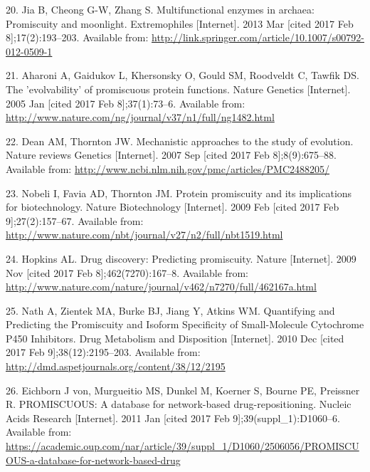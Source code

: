 \documentclass[12pt,twoside]{reedthesis}
\begin{document}
  \hypertarget{ref-jia_multifunctional_2013}{}
  20. Jia B, Cheong G-W, Zhang S. Multifunctional enzymes in archaea:
  Promiscuity and moonlight. Extremophiles {[}Internet{]}. 2013 Mar
  {[}cited 2017 Feb 8{]};17(2):193--203. Available from:
  \url{http://link.springer.com/article/10.1007/s00792-012-0509-1}
  
  \hypertarget{ref-aharoni_evolvability_2005}{}
  21. Aharoni A, Gaidukov L, Khersonsky O, Gould SM, Roodveldt C, Tawfik
  DS. The 'evolvability' of promiscuous protein functions. Nature Genetics
  {[}Internet{]}. 2005 Jan {[}cited 2017 Feb 8{]};37(1):73--6. Available
  from: \url{http://www.nature.com/ng/journal/v37/n1/full/ng1482.html}
  
  \hypertarget{ref-dean_mechanistic_2007}{}
  22. Dean AM, Thornton JW. Mechanistic approaches to the study of
  evolution. Nature reviews Genetics {[}Internet{]}. 2007 Sep {[}cited
  2017 Feb 8{]};8(9):675--88. Available from:
  \url{http://www.ncbi.nlm.nih.gov/pmc/articles/PMC2488205/}
  
  \hypertarget{ref-nobeli_protein_2009}{}
  23. Nobeli I, Favia AD, Thornton JM. Protein promiscuity and its
  implications for biotechnology. Nature Biotechnology {[}Internet{]}.
  2009 Feb {[}cited 2017 Feb 9{]};27(2):157--67. Available from:
  \url{http://www.nature.com/nbt/journal/v27/n2/full/nbt1519.html}
  
  \hypertarget{ref-hopkins_drug_2009}{}
  24. Hopkins AL. Drug discovery: Predicting promiscuity. Nature
  {[}Internet{]}. 2009 Nov {[}cited 2017 Feb 8{]};462(7270):167--8.
  Available from:
  \url{http://www.nature.com/nature/journal/v462/n7270/full/462167a.html}
  
  \hypertarget{ref-nath_quantifying_2010}{}
  25. Nath A, Zientek MA, Burke BJ, Jiang Y, Atkins WM. Quantifying and
  Predicting the Promiscuity and Isoform Specificity of Small-Molecule
  Cytochrome P450 Inhibitors. Drug Metabolism and Disposition
  {[}Internet{]}. 2010 Dec {[}cited 2017 Feb 9{]};38(12):2195--203.
  Available from: \url{http://dmd.aspetjournals.org/content/38/12/2195}
  
  \hypertarget{ref-von_eichborn_promiscuous_2011}{}
  26. Eichborn J von, Murgueitio MS, Dunkel M, Koerner S, Bourne PE,
  Preissner R. PROMISCUOUS: A database for network-based
  drug-repositioning. Nucleic Acids Research {[}Internet{]}. 2011 Jan
  {[}cited 2017 Feb 9{]};39(suppl\_1):D1060--6. Available from:
  \url{https://academic.oup.com/nar/article/39/suppl_1/D1060/2506056/PROMISCUOUS-a-database-for-network-based-drug}
  
\end{document}
